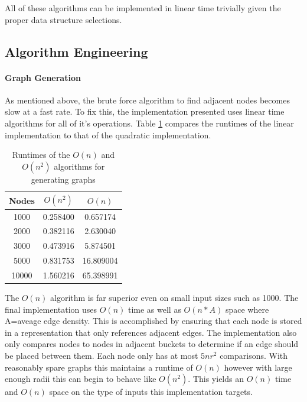 \documentclass{article}
\begin{document}
    All of these algorithms can be implemented in linear time trivially given the proper data structure selections.

  \subsection{Algorithm Engineering}
    \paragraph{Graph Generation}
    As mentioned above, the brute force algorithm to find adjacent nodes becomes slow at a fast rate.
    To fix this, the implementation presented uses linear time algorithms for all of it's operations.
	  Table \ref{runtime_comparison_table_brute} compares the runtimes of the linear implementation to that of the quadratic implementation.

	  \begin{table}
      \centering
      \label{runtime_comparison_table_brute}
  		\begin{tabular}{ |c|c|c| }
  			\hline
  			Nodes & $O(n^2)$ & $O(n)$ \\
  			\hline
  			  1000 & 0.258400 & 0.657174 \\
  			  \hline
  			  2000 & 0.382116 & 2.630040 \\
  			  \hline
  			  3000 & 0.473916 & 5.874501 \\
  			  \hline
  			  5000 & 0.831753 & 16.809004 \\
  			  \hline
  			  10000 & 1.560216 & 65.398991 \\
  			\hline
  		\end{tabular}
  		\caption{Runtimes of the $O(n)$ and $O(n^2)$ algorithms for generating graphs}
	  \end{table}

	  The $O(n)$ algorithm is far superior even on small input sizes such as 1000.
    The final implementation uses $O(n)$ time as well as $O(n*A)$ space where A=aveage edge density.
    This is accomplished by ensuring that each node is stored in a representation that only references adjacent edges.
    The implementation also only compares nodes to nodes in adjacent buckets to determine if an edge should be placed between them.
    Each node only has at most $5nr^2$ comparisons\cite{chen2017bipartite}.
    With reasonably spare graphs this maintains a runtime of $O(n)$ however with large enough radii this can begin to behave like $O(n^2)$.
    This yields an $O(n)$ time and $O(n)$ space on the type of inputs this implementation targets.
\end{document}
